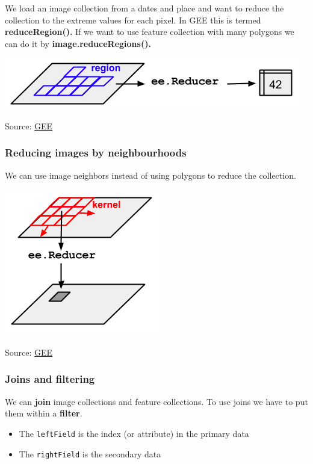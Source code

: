 \documentclass[
  letterpaper,
  DIV=11,
  numbers=noendperiod]{scrreprt}
\begin{document}
We load an image collection from a dates and place and want to reduce
the collection to the extreme values for each pixel. In GEE this is
termed \textbf{reduceRegion().} If we want to use feature collection
with many polygons we can do it by \textbf{image.reduceRegions().}

\includegraphics{./images/paste-E4392F67.png}

Source:
\href{https://developers.google.com/earth-engine/guides/reducers_reduce_region}{GEE}

\hypertarget{reducing-images-by-neighbourhoods}{%
\subsubsection{Reducing images by
neighbourhoods}\label{reducing-images-by-neighbourhoods}}

We can use image neighbors instead of using polygons to reduce the
collection.

\includegraphics{./images/paste-22B32BD6.png}

Source:
\href{https://developers.google.com/earth-engine/guides/reducers_reduce_neighborhood}{GEE}

\hypertarget{joins-and-filtering}{%
\subsubsection{Joins and filtering}\label{joins-and-filtering}}

We can \textbf{join} image collections and feature collections. To use
joins we have to put them within a \textbf{filter}.

\begin{itemize}
\item
  The \texttt{leftField} is the index (or attribute) in the primary data
\item
  The \texttt{rightField} is the secondary data
\end{itemize}
\end{document}

